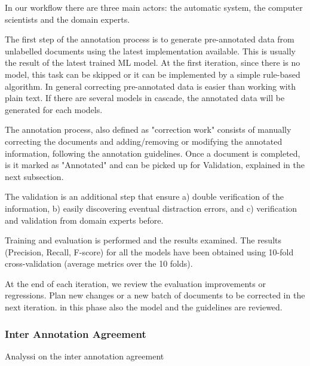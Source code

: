 \documentclass[a4paper,10pt]{article}
\begin{document}
In our workflow there are three main actors: the automatic system, the computer scientists and the domain experts.

The first step of the annotation process is to generate pre-annotated data from unlabelled documents using the latest implementation available. This is usually the result of the latest trained ML model.  
At the first iteration, since there is no model, this task can be skipped or it can be implemented by a simple rule-based algorithm. In general correcting pre-annotated data is easier than working with plain text. 
If there are several models in cascade, the annotated data will be generated for each models.

The annotation process, also defined as "correction work" consists of manually correcting the documents and adding/removing or modifying the annotated information, following the annotation guidelines. 
Once a document is completed, is it marked as "Annotated" and can be picked up for Validation, explained in the next subsection. 

The validation is an additional step that ensure a) double verification of the information, b) easily discovering eventual distraction errors, and c) verification and validation from domain experts before. 


Training and evaluation is performed and the results examined. The results (Precision, Recall, F-score) for all the models have been obtained using 10-fold cross-validation (average metrics over the 10 folds).

At the end of each iteration, we review the evaluation improvements or regressions. Plan new changes or a new batch of documents to be corrected in the next iteration. in this phase also the model and the guidelines are reviewed.

\subsubsection{Inter Annotation Agreement}

Analyssi on the inter annotation agreement 
\end{document}
